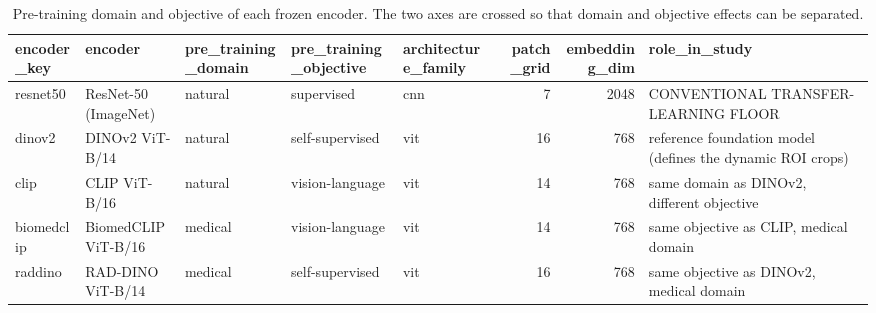 \begin{table}
\caption{Pre-training domain and objective of each frozen encoder. The two axes are crossed so that domain and objective effects can be separated.}
\label{tab:encoder-registry}
\begin{tabular}{lllllrrl}
\toprule
encoder\_key & encoder & pre\_training\_domain & pre\_training\_objective & architecture\_family & patch\_grid & embedding\_dim & role\_in\_study \\
\midrule
resnet50 & ResNet-50 (ImageNet) & natural & supervised & cnn & 7 & 2048 & CONVENTIONAL TRANSFER-LEARNING FLOOR \\
dinov2 & DINOv2 ViT-B/14 & natural & self-supervised & vit & 16 & 768 & reference foundation model (defines the dynamic ROI crops) \\
clip & CLIP ViT-B/16 & natural & vision-language & vit & 14 & 768 & same domain as DINOv2, different objective \\
biomedclip & BiomedCLIP ViT-B/16 & medical & vision-language & vit & 14 & 768 & same objective as CLIP, medical domain \\
raddino & RAD-DINO ViT-B/14 & medical & self-supervised & vit & 16 & 768 & same objective as DINOv2, medical domain \\
\bottomrule
\end{tabular}
\end{table}
